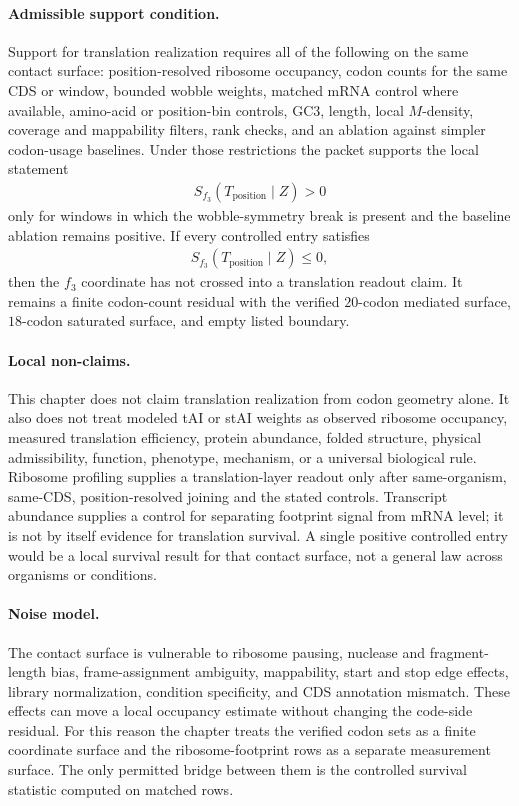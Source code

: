 \paragraph{Admissible support condition.}
Support for translation realization requires all of the following on the same contact surface: position-resolved ribosome occupancy, codon counts for the same CDS or window, bounded wobble weights, matched mRNA control where available, amino-acid or position-bin controls, GC3, length, local $M$-density, coverage and mappability filters, rank checks, and an ablation against simpler codon-usage baselines.  Under those restrictions the packet supports the local statement
$$
\begin{aligned}
S_{f_3}(T_{\mathrm{position}}\mid Z) > 0
\end{aligned}
$$
only for windows in which the wobble-symmetry break is present and the baseline ablation remains positive.  If every controlled entry satisfies
$$
\begin{aligned}
S_{f_3}(T_{\mathrm{position}}\mid Z) \leq 0,
\end{aligned}
$$
then the $f_3$ coordinate has not crossed into a translation readout claim.  It remains a finite codon-count residual with the verified $20$-codon mediated surface, $18$-codon saturated surface, and empty listed boundary.

\paragraph{Local non-claims.}
This chapter does not claim translation realization from codon geometry alone.  It also does not treat modeled tAI or stAI weights as observed ribosome occupancy, measured translation efficiency, protein abundance, folded structure, physical admissibility, function, phenotype, mechanism, or a universal biological rule.  Ribosome profiling supplies a translation-layer readout only after same-organism, same-CDS, position-resolved joining and the stated controls.  Transcript abundance supplies a control for separating footprint signal from mRNA level; it is not by itself evidence for translation survival.  A single positive controlled entry would be a local survival result for that contact surface, not a general law across organisms or conditions.

\paragraph{Noise model.}
The contact surface is vulnerable to ribosome pausing, nuclease and fragment-length bias, frame-assignment ambiguity, mappability, start and stop edge effects, library normalization, condition specificity, and CDS annotation mismatch.  These effects can move a local occupancy estimate without changing the code-side residual.  For this reason the chapter treats the verified codon sets as a finite coordinate surface and the ribosome-footprint rows as a separate measurement surface.  The only permitted bridge between them is the controlled survival statistic computed on matched rows.
